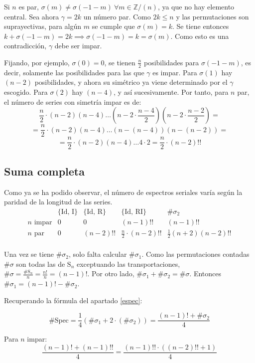 		Si $n$ es par, $\sigma(m)\neq\sigma(-1-m)\ \forall m\in \mathbb{Z} / (n)$, ya que no hay elemento central. Sea ahora $\gamma=2k$ un número par. Como $2k\leq n$ y las permutaciones son suprayectivas, para algún $m$ se cumple que $\sigma(m)=k$. Se tiene entonces $k+\sigma(-1-m)=2k\implies\sigma(-1-m)=k=\sigma(m)$. Como esto es una contradicción, $\gamma$ debe ser impar.
		
		Fijando, por ejemplo, $\sigma(0)=0$, se tienen $\frac{n}{2}$ posibilidades para $\sigma(-1-m)$, es decir, solamente las posibilidades para las que $\gamma$ es impar. Para $\sigma(1)$ hay $(n-2)$ posibilidades, y ahora su simétrico ya viene determinado por el $\gamma$ escogido. Para $\sigma(2)$ hay $(n-4)$, y así sucesivamente. \cite{reiner} Por tanto, para $n$ par, el número de series con simetría impar es de: 
		\[\frac{n}{2}\cdot(n-2)(n-4)\ldots(n-2\cdot\frac{n-4}{2})(n-2\cdot\frac{n-2}{2})=\]
		\[=\frac{n}{2}\cdot(n-2)(n-4)\ldots(n-(n-4))(n-(n-2))=\]
		\[=\frac{n}{2}\cdot(n-2)(n-4)\ldots4\cdot2=\frac{n}{2}\cdot(n-2)!!\]
			\newpage
	\subsection*{Suma completa}
		Como ya se ha podido observar, el número de espectros seriales varía según la paridad de la longitud de las series.		
		\def\arraystretch{1.5}
		\[\begin{array}{c|c|c|c|c}
		&\{\text{Id, I}\}&\{\text{Id, R}\}&\{\text{Id, RI}\}&\#\sigma_2\\\hline
		n\text{ impar}&0&0&(n-1)!!&(n-1)!!\\\hline
		n\text{ par}&0&(n-2)!!&\frac{n}{2}\cdot(n-2)!!&\frac{1}{2}(n+2)(n-2)!!\\
		\end{array}\]
		\def\arraystretch{1}
		
		Una vez se tiene $\#\sigma_2$, solo falta calcular $\#\sigma_1$. Como las permutaciones contadas $\#\sigma$ son todas las de $\text{S}_n$ exceptuando las transportaciones, $\#\sigma=\frac{\#\text{S}_n}{n}=\frac{n!}{n}=(n-1)!$. Por otro lado, $\#\sigma_1 +\#\sigma_2=\#\sigma$. Entonces $\#\sigma_1=(n-1)!-\#\sigma_2$.
		
		Recuperando la fórmula del apartado \ref{espec}:
		
		\[\#\text{Spec}=
		\frac{1}{4}\left(\#\sigma_1+2\cdot(\#\sigma_2)\right)=
		\frac{(n-1)!+\#\sigma_2}{4}\]
		
		Para $n$ impar:
		\[\frac{(n-1)!+(n-1)!!}{4}=\frac{(n-1)!!\cdot\left((n-2)!!+1\right)}{4}\]
		
